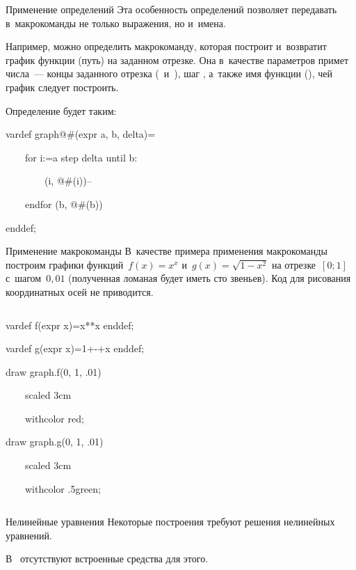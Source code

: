 \begin{frame}{Применение определений }
Эта особенность определений  позволяет передавать
в~макрокоманды не только выражения, но и~имена.

Например, можно определить макрокоманду, которая построит и~возвратит график
функции (путь) на заданном отрезке. Она в~качестве параметров примет числа~—
концы заданного отрезка ( и~), шаг ,
а~также имя функции (), чей график следует построить.

Определение будет таким:
\begin{programlisting}
vardef graph@\#(expr a, b, delta)=\par
~~~~for i:=a step delta until b:\par
~~~~~~~~(i, @\#(i))--\par
~~~~endfor (b, @\#(b))\par
enddef;
\end{programlisting}
\end{frame}

\begin{frame}{Применение макрокоманды }
В~качестве примера применения макрокоманды  построим графики
функций $f(x)=x^x$ и~$g(x)=\sqrt{1-x^2}$ на отрезке $[0;1]$ с~шагом $0{,}01$
(полученная ломаная будет иметь сто звеньев). Код для рисования координатных
осей не приводится.

\begin{columns}
\centerline{}
\begin{programlisting}
vardef f(expr x)=x**x enddef;\par
vardef g(expr x)=1+-+x enddef;\par
\leavevmode\par
draw graph.f(0, 1, .01)\par
~~~~scaled 3cm\par
~~~~withcolor red;\par
draw graph.g(0, 1, .01)\par
~~~~scaled 3cm\par
~~~~withcolor .5green;
\end{programlisting}
\end{columns}
\end{frame}

\begin{frame}{Нелинейные уравнения}
Некоторые построения требуют решения нелинейных уравнений.

В~ отсутствуют встроенные средства для этого.
\end{frame}

